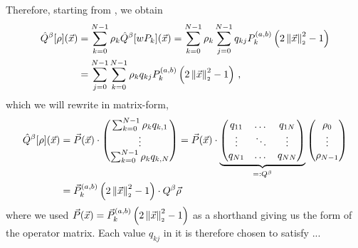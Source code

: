 Therefore, starting from , we obtain
\begin{align*}
  \hat{Q}^\beta[\rho](\vec{x}) & = \sum_{k=0}^{N-1} \rho_k \hat{Q}^\beta[wP_k](\vec{x}) = \sum_{k=0}^{N-1} \rho_k \sum_{j=0}^{N-1} q_{kj} P_{k}^{(a, b)}\left(2 \left\lVert\vec{x}\right\rVert_{\scriptscriptstyle 2}^2 - 1\right) \\
                               & = \sum_{j=0}^{N-1} \sum_{k=0}^{N-1} \rho_k q_{kj} P_{k}^{(a, b)}\left(2 \left\lVert\vec{x}\right\rVert_{\scriptscriptstyle 2}^2 - 1\right)\,,
\end{align*}
which we will rewrite in matrix-form,
\begin{align*}
  \hat{Q}^\beta[\rho](\vec{x}) & = \vec{P}(\vec{x}) \cdot
  \begin{pmatrix}
    \sum_{k=0}^{N-1} \rho_k q_{k,1} \\
    \vdots                          \\
    \sum_{k=0}^{N-1} \rho_k q_{k,N}
  \end{pmatrix} = \vec{P}(\vec{x}) \cdot
  \underbrace{
    \begin{pmatrix}
      q_{11} & \dots  & q_{1N} \\
      \vdots & \ddots & \vdots \\
      q_{N1} & \dots  & q_{NN} \\
    \end{pmatrix}
  }_{=: Q^\beta}
  \begin{pmatrix}
    \rho_0 \\
    \vdots \\
    \rho_{N-1}
  \end{pmatrix}                                                          \\
                               & = \vec{P}_{k}^{(a, b)}\left(2 \left\lVert\vec{x}\right\rVert_{\scriptscriptstyle 2}^2 - 1\right) \cdot Q^\beta \vec{\rho}
\end{align*}
where we used $\vec{P}(\vec{x}) = \vec{P}_{k}^{(a, b)}\left(2 \left\lVert\vec{x}\right\rVert_{\scriptscriptstyle 2}^2 - 1\right)$ as a shorthand
giving us the form of the operator matrix.
Each value $q_{kj}$ in it is therefore chosen to satisfy ...
\hierKoennteIhreWerbungStehen
